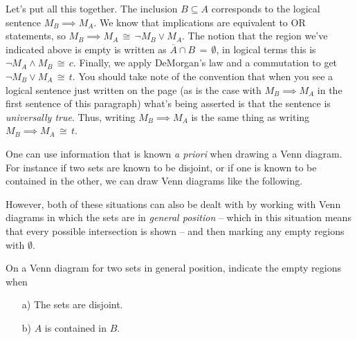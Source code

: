 

\vspace{.1in}

Let's put all this together.  The inclusion $B \subseteq A$ corresponds
to the logical sentence $M_B \implies M_A$.  We know that implications
are equivalent to OR statements, so $M_B \implies M_A \, \cong \, 
\lnot M_B \lor M_A$.  The notion that the region we've 
indicated above is empty is written as $\overline{A} \cap B \, = \, \emptyset$,
in logical terms this is $\lnot M_A \land M_B \, \cong \, c$.  
Finally, we apply DeMorgan's law and a commutation to get 
$\lnot M_B \lor M_A \, \cong \, t$.  You should take note of the 
convention that when you see a logical sentence just written on the 
page (as is the case with $M_B \implies M_A$ in the first sentence
of this paragraph) what's being asserted is that the sentence is 
\emph{universally true}.
Thus, writing $M_B \implies M_A$ is the same thing as writing 
$M_B \implies M_A \, \cong \, t$.

One can use information that is known \emph{a priori} when 
drawing a Venn diagram.  For instance if two sets are known 
to be disjoint, or if one is known to be contained in the other,
we can draw Venn diagrams like the following.

\vspace{.1in}



\vspace{.2in}



\vspace{.1in}

However, both of these situations can also be dealt with
by working with Venn diagrams in which the sets are in 
 \emph{general position} -- which
in this situation means that every possible intersection is
shown -- and then marking any empty regions with $\emptyset$.

\begin{exer}
On a Venn diagram for two sets in general position, indicate
the empty regions when
\begin{itemize}
\item[a)] The sets are disjoint.
\item[b)] $A$ is contained in $B$.
\end{itemize}


\end{exer}

